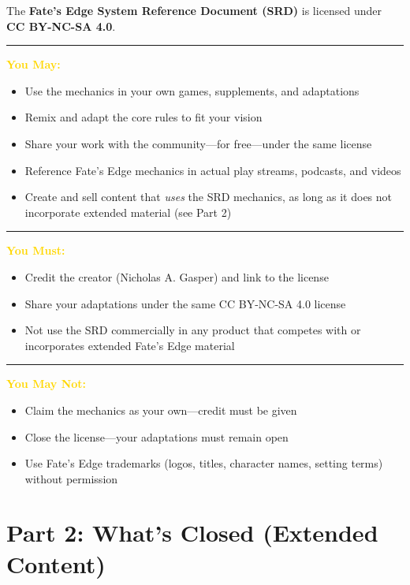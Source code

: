 \documentclass[11pt]{article}
\newenvironment{policybox}[2]{
  \begin{framed}
  \setlength{\fboxsep}{12pt}
  \color{textlight}
  \noindent
  \textcolor{#2}{\rule{4pt}{\dimexpr\height+4pt\relax}}%
  \hspace{8pt}%
  \textbf{\textcolor{gold}{#1}}\par
  \vspace{4pt}
}{
  \end{framed}
}
\begin{document}
The \textbf{Fate's Edge System Reference Document (SRD)} is licensed under \textbf{CC BY-NC-SA 4.0}.

\begin{policybox}{You May:}{borderopen}
  \begin{itemize}[leftmargin=*, itemsep=2pt]
    \item Use the mechanics in your own games, supplements, and adaptations
    \item Remix and adapt the core rules to fit your vision
    \item Share your work with the community---for free---under the same license
    \item Reference Fate's Edge mechanics in actual play streams, podcasts, and videos
    \item Create and sell content that \emph{uses} the SRD mechanics, as long as it does not incorporate extended material (see Part 2)
  \end{itemize}
\end{policybox}

\begin{policybox}{You Must:}{borderopen}
  \begin{itemize}[leftmargin=*, itemsep=2pt]
    \item Credit the creator (Nicholas A. Gasper) and link to the license
    \item Share your adaptations under the same CC BY-NC-SA 4.0 license
    \item Not use the SRD commercially in any product that competes with or incorporates extended Fate's Edge material
  \end{itemize}
\end{policybox}

\begin{policybox}{You May Not:}{borderopen}
  \begin{itemize}[leftmargin=*, itemsep=2pt]
    \item Claim the mechanics as your own---credit must be given
    \item Close the license---your adaptations must remain open
    \item Use Fate's Edge trademarks (logos, titles, character names, setting terms) without permission
  \end{itemize}
\end{policybox}

\section*{Part 2: What's Closed (Extended Content)}
\end{document}
